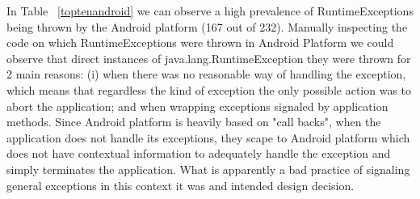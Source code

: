 \documentclass[conference]{IEEEtran}
\begin{document}
In Table ~\ref{toptenandroid} we can observe a high prevalence of
RuntimeExceptions being thrown by the Android platform (167 out of 232).
Manually inspecting the code on which RuntimeExceptions were thrown in Android
Platform we could observe that direct instances of java.lang.RuntimeException
they were thrown for 2 main reasons: (i) when there was no reasonable way of
handling the exception, which means that regardless the kind of exception the
only possible action was to abort the application; and when wrapping exceptions
signaled by application methods. Since Android platform is heavily based on
"call backs", when the application does not handle its exceptions, they scape to
Android platform which does not have contextual information to adequately handle
the exception and simply terminates the application. What is apparently a bad
practice of signaling general exceptions in this context it was and intended
design decision.







\end{document}
